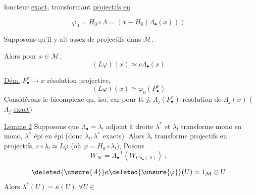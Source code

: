 foncteur \uline{exact}, transformant \uline{projectifs en }

\[
\varphi_0=\underline{H_0}\circ\Lambda=(x\mathbin{-}H_0(\Lambda_\bullet(x)))
\]

Supposons qu'il y ait assez de projectifs dans $\mathcal M$.

Alors pour  $x\in\mathcal M$,
\[
(L\varphi)(x)\simeq c\Lambda_\bullet(x)
\]

\uline{Dém.} 
$P_\bullet^x\longrightarrow x$ résolution projective,
\[
(L\varphi)(x)\simeq\varphi_0(P_\bullet^x)
\]
 Considérons le bicomplexe
qu. iso, car pour tt $j$, $\Lambda_j(P_\bullet^x)$
\deleted{\unsure{$\longrightarrow$}} résolution de $\Lambda_j(x)$
($\Lambda_j$ \uline{exact})


\uline{Lemme 2} Supposons que $\Lambda_\bullet=\lambda_!$
 adjoint à droite
 $\lambda^*$ et $\lambda_!$ transforme mono en mono,
$\lambda^*$ épi en épi (donc $\lambda_!,\lambda^*$ exacts).
Alors $\lambda_!$ transforme projectifs en projectifs,
$c\circ\lambda_!\simeq L\varphi$ (où $\varphi=H_0\circ\lambda_!$),
Posons
\[
W_{\mathcal M}=\Lambda_\bullet^{-1}(W_{\mathrm{Ch}_\bullet(A)})\ ;
\]


\[
\deleted{\unsure{A}}\kappa\deleted{\unsure{\varphi}}(U)=1_{\mathcal M}\otimes U
\]
Alors \deleted{\unsure{$\kappa$}} $\lambda^*(U)=\kappa(U)$
$\forall U\in$


